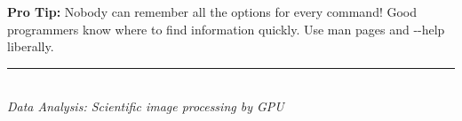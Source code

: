\documentclass[10pt, a4paper, landscape]{article}
\begin{document}
\begin{multicols}{2}
\vspace{1mm}
\begin{tipbox}
\textbf{Pro Tip:} Nobody can remember all the options for every command! Good programmers know where to find information quickly. Use man pages and -{}-help liberally.
\end{tipbox}

\end{multicols}

\vspace{1mm}
\begin{center}
\rule{\textwidth}{0.4pt}\\[1mm]
\footnotesize\textit{Data Analysis: Scientific image processing by GPU}
\end{center}
\end{document}

